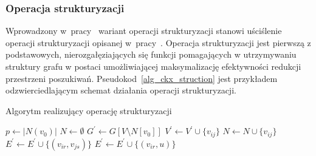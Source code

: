 \subsubsection{\textbf{Operacja strukturyzacji}}\label{sss_ckx_struction}
\par{
  Wprowadzony w~pracy~\cite{ImprovedBounds10} wariant operacji strukturyzacji stanowi uściślenie operacji strukturyzacji opisanej w~pracy~\cite{Ebengger:1984}.
  Operacja strukturyzacji jest pierwszą z podstawowych, nierozgałęziających się funkcji pomagających w utrzymywaniu struktury grafu w postaci umożliwiającej maksymalizację efektywności redukcji przestrzeni poszukiwań.
  Pseudokod~\ref{alg_ckx_struction} jest przykładem odzwierciedlającym schemat działania operacji strukturyzacji.
  \begin{algorithm}
    \caption{Algorytm realizujący operację strukturyzacji}\label{alg_ckx_struction}
    \begin{algorithmic}[1]



        \State $p \gets |N(v_0)|$
        \State $N \gets \emptyset$
        \State $G^\prime \gets G[V \setminus N[v_0]]$
              \State $V^\prime \gets V^\prime \cup \{v_{ij}\}$
              \State $N \gets N \cup \{v_{ij}\}$
            \EndIf
          \EndFor
        \EndFor
              \State $E^\prime \gets E^\prime \cup \{(v_{ir}, v_{js})\}$
            \EndIf
          \EndFor
              \State$E^\prime \gets E^\prime \cup \{(v_{ir}, u)\}$
            \EndIf
          \EndFor
        \EndFor
      \EndFunction
    \end{algorithmic}
  \end{algorithm}
}
